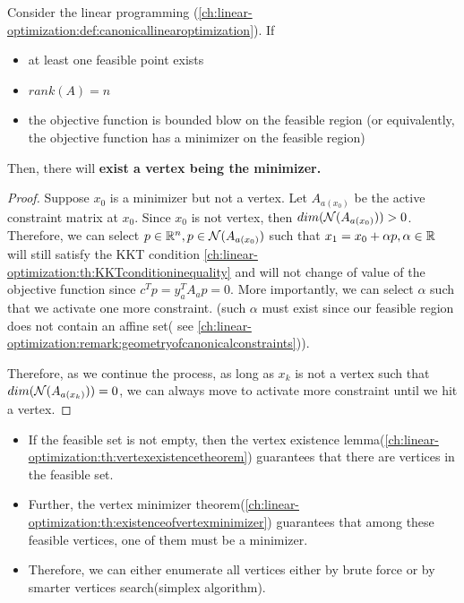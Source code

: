 \begin{refsection}
\begin{theorem}\cite[lec 6]{Robinson2015nonlinear2}\label{ch:linear-optimization:th:existenceofvertexminimizer}
Consider the linear programming (\autoref{ch:linear-optimization:def:canonicallinearoptimization}). If 
\begin{itemize}
	\item at least one feasible point exists
	\item $rank(A) = n$
	\item the objective function is bounded blow on the feasible region (or equivalently, the objective function has a minimizer on the feasible region) 
\end{itemize}
Then, there will \textbf{exist a vertex being the minimizer.} 
\end{theorem}
\begin{proof}
Suppose $x_0$ is a minimizer but not a vertex. Let $A_{a(x_0)}$ be the active constraint matrix at $x_0$. Since $x_0$ is not vertex, then $dim(\mathcal{N}(A_{a(x_0)})) > 0$. Therefore, we can select $p\in \mathbb{R}^n, p\in \mathcal{N}(A_{a(x_0)})$ such that $x_1 = x_0 + \alpha p, \alpha \in \mathbb{R}$ will still satisfy the KKT condition \autoref{ch:linear-optimization:th:KKTconditioninequality} and will not change of value of the objective function since $c^Tp = y_a^TA_a p = 0$. More importantly, we can select $\alpha$ such that we activate one more constraint. (such $\alpha$ must exist since our feasible region does not contain an affine set( see \autoref{ch:linear-optimization:remark:geometryofcanonicalconstraints})).

Therefore, as we continue the process,  as long as $x_k$ is not a vertex such that  $dim(\mathcal{N}(A_{a(x_k)})) = 0$, we can always move to activate more constraint until we hit a vertex.
\end{proof}


\begin{remark}\hfill
\begin{itemize}
	\item If the feasible set is not empty, then the vertex existence lemma(\autoref{ch:linear-optimization:th:vertexexistencetheorem}) guarantees that there are vertices in the feasible set.
	\item Further, the vertex minimizer theorem(\autoref{ch:linear-optimization:th:existenceofvertexminimizer}) guarantees that among these feasible vertices, one of them must be a minimizer.
	\item Therefore, we can either enumerate all vertices either by brute force or by smarter vertices search(simplex algorithm).
\end{itemize}
\end{remark}




\end{refsection}

